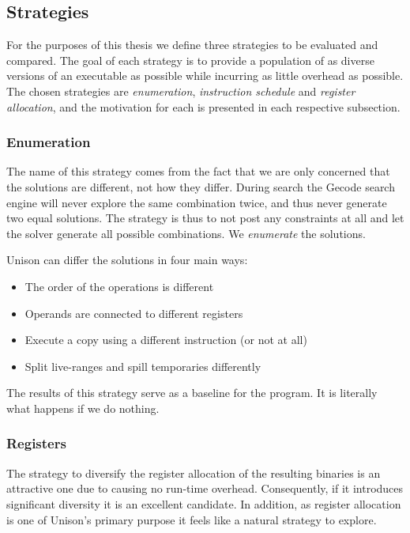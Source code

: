\subsection{Strategies}
\label{sec:strategies}

For the purposes of this thesis we define three strategies to be evaluated and compared.
The goal of each strategy is to provide a population of as diverse versions of an
executable as possible while incurring as little overhead as possible. The chosen
strategies are \textit{enumeration}, \textit{instruction schedule} and
\textit{register allocation}, and the motivation for each is presented in each respective
subsection.

\subsubsection{Enumeration}

The name of this strategy comes from the fact that we are only concerned that the solutions
are different, not how they differ. During search the Gecode search engine will never
explore the same combination twice, and thus never generate two equal solutions. The
strategy is thus to not post any constraints at all and let the solver generate all
possible combinations. We \textit{enumerate} the solutions.

Unison can differ the solutions in four main ways:

\begin{itemize}
	\item The order of the operations is different
	\item Operands are connected to different registers
	\item Execute a copy using a different instruction (or not at all)
	\item Split live-ranges and spill temporaries differently
\end{itemize}

The results of this strategy serve as a baseline for the program. It is literally what
happens if we do nothing.

\subsubsection{Registers}

The strategy to diversify the register allocation of the resulting binaries is an attractive
one due to causing no run-time overhead. Consequently, if it introduces significant diversity
it is an excellent candidate. In addition, as register allocation is one of Unison's
primary purpose it feels like a natural strategy to explore.

